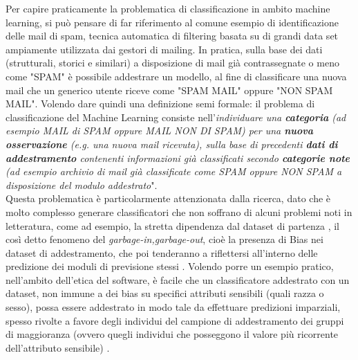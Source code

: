 Per capire praticamente la problematica di classificazione in ambito machine learning, si può pensare di far riferimento al comune esempio di identificazione delle mail di spam, tecnica automatica di filtering basata su di grandi data set ampiamente utilizzata dai gestori di mailing. In pratica, sulla base dei dati (strutturali, storici e similari) a disposizione di mail già contrassegnate o meno come "SPAM" è possibile addestrare un modello, al fine di classificare una nuova mail che un generico utente riceve come "SPAM MAIL" oppure "NON SPAM MAIL". Volendo dare quindi una definizione semi formale: il problema di classificazione del Machine Learning consiste nell'\textit{individuare una \textbf{categoria} (ad esempio MAIL di SPAM oppure MAIL NON DI SPAM) per una \textbf{nuova osservazione} (e.g. una nuova mail ricevuta), sulla base di precedenti \textbf{dati di addestramento} contenenti informazioni già classificati secondo \textbf{categorie note} (ad esempio archivio di mail già classificate come SPAM oppure NON SPAM a disposizione del modulo addestrato}".\\

Questa problematica è particolarmente attenzionata dalla ricerca, dato che è molto complesso generare classificatori che non soffrano di alcuni problemi noti in letteratura, come ad esempio, la stretta dipendenza dal dataset di partenza \cite{supervisedML&Classification}, il così detto fenomeno del \textit{garbage-in,garbage-out}, cioè la presenza di Bias nei dataset di addestramento, che poi tenderanno a riflettersi all'interno delle predizione dei moduli di previsione stessi \cite{evalFairClassification}. Volendo porre un esempio pratico, nell'ambito dell'etica del software, è facile che un classificatore addestrato con un dataset, non immune a dei bias su specifici attributi sensibili (quali razza o sesso), possa essere addestrato in modo tale da effettuare predizioni imparziali, spesso rivolte a favore degli individui del campione di addestramento dei gruppi di maggioranza (ovvero quegli individui che posseggono il valore più ricorrente dell'attributo sensibile) \cite{evalFairClassification} .


